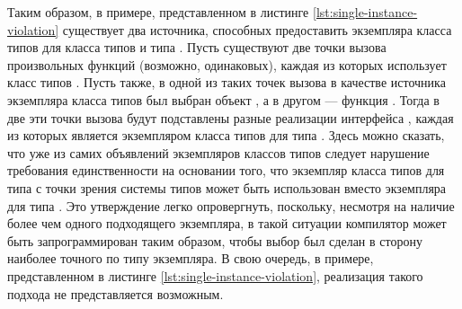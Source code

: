 Таким образом, в примере, представленном в листинге \ref{lst:single-instance-violation} существует два источника, способных предоставить экземпляра класса типов для класса типов  и типа . Пусть существуют две точки вызова произвольных функций (возможно, одинаковых), каждая из которых использует класс типов . Пусть также, в одной из таких точек вызова в качестве источника экземпляра класса типов был выбран объект , а в другом --- функция . Тогда в две эти точки вызова будут подставлены разные реализации интерфейса , каждая из которых является экземпляром класса типов  для типа . Здесь можно сказать, что уже из самих объявлений экземпляров классов типов следует нарушение требования единственности на основании того, что экземпляр класса типов  для типа  с точки зрения системы типов может быть использован вместо экземпляра для типа . Это утверждение легко опровергнуть, поскольку, несмотря на наличие более чем одного подходящего экземпляра, в такой ситуации компилятор может быть запрограммирован таким образом, чтобы выбор был сделан в сторону наиболее точного по типу экземпляра. В свою очередь, в примере, представленном в листинге \ref{lst:single-instance-violation}, реализация такого подхода не представляется возможным.   

